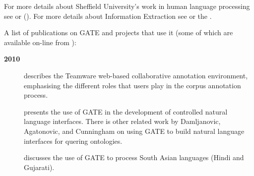 For more details about Sheffield University's work in human
language processing see
or
 (\cite{Cun99b}).
For more details about Information Extraction see
or the
.

A list of publications on GATE and projects that use it (some of which are available on-line from
):

\textbf{2010}
%
\begin{description}

\item[\cite{Bontcheva2010a}] describes the Teamware web-based collaborative annotation environment, emphasising the different roles that users play in the corpus annotation process. 

\item[\cite{Damljanovic10}] presents the use of GATE in the development of controlled natural language interfaces. There is other related work by Damljanovic, Agatonovic, and Cunningham on using GATE to build natural language interfaces for quering ontologies. 

\item[\cite{Aswani10b}] discusses the use of GATE to process South Asian languages (Hindi and Gujarati). 

%
\end{description}

